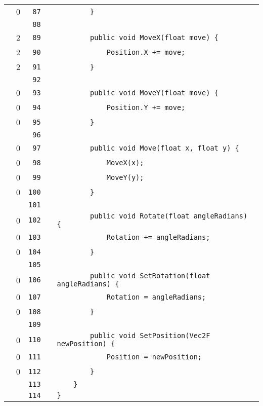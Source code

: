 \documentclass[a4paper,landscape,10pt]{article}
\begin{document}
\begin{longtable}[l]{lrrll}
\cellcolor{red} & 0 & \verb~87~ & & \verb~        }~\\
\cellcolor{gray} &  & \verb~88~ & & \verb~~\\
\cellcolor{green} & 2 & \verb~89~ & & \verb~        public void MoveX(float move) {~\\
\cellcolor{green} & 2 & \verb~90~ & & \verb~            Position.X += move;~\\
\cellcolor{green} & 2 & \verb~91~ & & \verb~        }~\\
\cellcolor{gray} &  & \verb~92~ & & \verb~~\\
\cellcolor{red} & 0 & \verb~93~ & & \verb~        public void MoveY(float move) {~\\
\cellcolor{red} & 0 & \verb~94~ & & \verb~            Position.Y += move;~\\
\cellcolor{red} & 0 & \verb~95~ & & \verb~        }~\\
\cellcolor{gray} &  & \verb~96~ & & \verb~~\\
\cellcolor{red} & 0 & \verb~97~ & & \verb~        public void Move(float x, float y) {~\\
\cellcolor{red} & 0 & \verb~98~ & & \verb~            MoveX(x);~\\
\cellcolor{red} & 0 & \verb~99~ & & \verb~            MoveY(y);~\\
\cellcolor{red} & 0 & \verb~100~ & & \verb~        }~\\
\cellcolor{gray} &  & \verb~101~ & & \verb~~\\
\cellcolor{red} & 0 & \verb~102~ & & \verb~        public void Rotate(float angleRadians) {~\\
\cellcolor{red} & 0 & \verb~103~ & & \verb~            Rotation += angleRadians;~\\
\cellcolor{red} & 0 & \verb~104~ & & \verb~        }~\\
\cellcolor{gray} &  & \verb~105~ & & \verb~~\\
\cellcolor{red} & 0 & \verb~106~ & & \verb~        public void SetRotation(float angleRadians) {~\\
\cellcolor{red} & 0 & \verb~107~ & & \verb~            Rotation = angleRadians;~\\
\cellcolor{red} & 0 & \verb~108~ & & \verb~        }~\\
\cellcolor{gray} &  & \verb~109~ & & \verb~~\\
\cellcolor{red} & 0 & \verb~110~ & & \verb~        public void SetPosition(Vec2F newPosition) {~\\
\cellcolor{red} & 0 & \verb~111~ & & \verb~            Position = newPosition;~\\
\cellcolor{red} & 0 & \verb~112~ & & \verb~        }~\\
\cellcolor{gray} &  & \verb~113~ & & \verb~    }~\\
\cellcolor{gray} &  & \verb~114~ & & \verb~}~\\
\end{longtable}
\newpage
\end{document}
